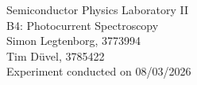 \begin{centering}
	\huge Semiconductor Physics Laboratory \RN{2}\\
	\LARGE B4: Photocurrent Spectroscopy\\
	\vspace{0.35cm}
	\normalsize Simon Legtenborg, 3773994 \\
	\normalsize Tim Düvel, 3785422 \\
	\normalsize Experiment conducted on 08/03/2026 \\
	\vspace{1cm}
\end{centering}
